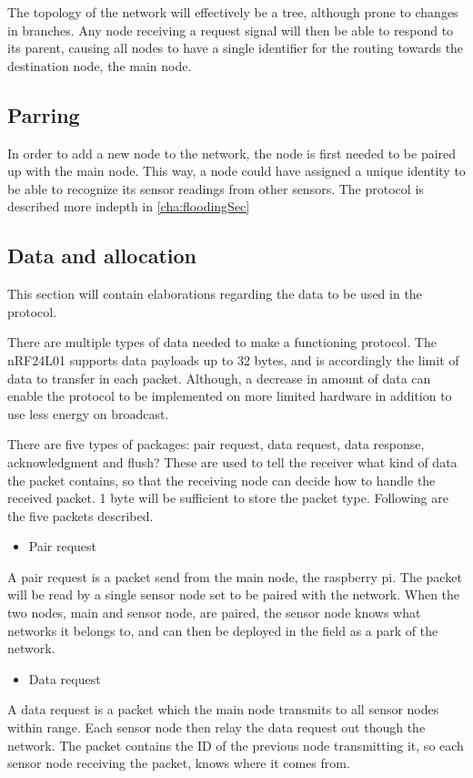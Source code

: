 The topology of the network will effectively be a tree, although prone to changes in branches.
Any node receiving a request signal will then be able to respond to its parent, causing all nodes to have a single identifier for the routing towards the destination node, the main node.

\subsection{Parring}
In order to add a new node to the network, the node is first needed to be paired up with the main node.
This way, a node could have assigned a unique identity to be able to recognize its sensor readings from other sensors. 
The protocol is described more indepth in \ref{cha:floodingSec}

\subsection{Data and allocation}
This section will contain elaborations regarding the data to be used in the protocol.

There are multiple types of data needed to make a functioning protocol. The nRF24L01 supports data payloads up to 32 bytes, and is accordingly the limit of data to transfer in each packet.
Although, a decrease in amount of data can enable the protocol to be implemented on more limited hardware in addition to use less energy on broadcast.

There are five types of packages: pair request, data request, data response, acknowledgment and flush?
These are used to tell the receiver what kind of data the packet contains, so that the receiving node can decide how to handle the received packet. 1 byte will be sufficient to store the packet type.
Following are the five packets described.

\begin{itemize}
\item Pair request
\end{itemize}
A pair request is a packet send from the main node, the raspberry pi.
The packet will be read by a single sensor node set to be paired with the network.
When the two nodes, main and sensor node, are paired, the sensor node knows what networks it belongs to, and can then be deployed in the field as a park of the network. 

\begin{itemize}
\item Data request
\end{itemize}
A data request is a packet which the main node transmits to all sensor nodes within range.
Each sensor node then relay the data request out though the network.
The packet contains the ID of the previous node transmitting it, so each sensor node receiving the packet, knows where it comes from.


